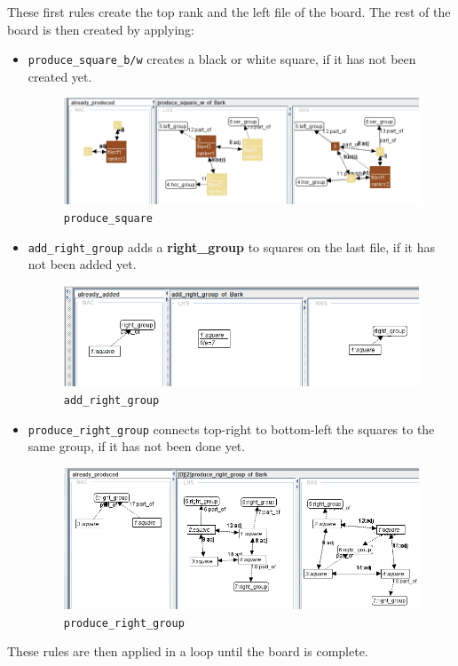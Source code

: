 \documentclass[twocolumn, a4paper]{scrartcl}
\newcommand{\noderepr}[1]{\textsf{\textbf{#1}}}
\begin{document}
    These first rules create the top rank and the left file of the board. The rest of the board is then created by applying:
    \begin{itemize}
        \item \texttt{produce\_square\_b/w} creates a black or white square, if it has not been created yet.
        \begin{figure}[H]
            \centering
            \includegraphics[width=.8\linewidth]{images/produce_square.png}
            \caption{\texttt{produce\_square}}
        \end{figure}

        \item \texttt{add\_right\_group} adds a \noderepr{right\_group} to squares on the last file, if it has not been added yet.
        \begin{figure}[H]
            \centering
            \includegraphics[width=.8\linewidth]{images/add_right_group.png}
            \caption{\texttt{add\_right\_group}}
        \end{figure}

        \item \texttt{produce\_right\_group} connects top-right to bottom-left the squares to the same group, if it has not been done yet.
        \begin{figure}[H]
            \centering
            \includegraphics[width=.8\linewidth]{images/produce_right_group.png}
            \caption{\texttt{produce\_right\_group}}
        \end{figure}
    \end{itemize}
    These rules are then applied in a loop until the board is complete.
\end{document}
